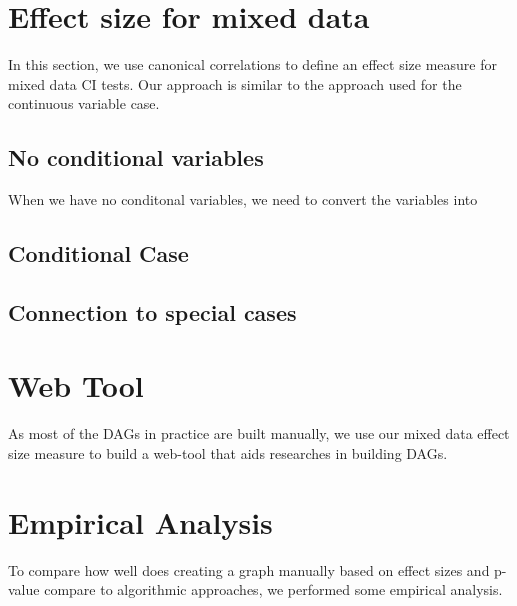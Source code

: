 \documentclass[letterpaper]{article} %
\begin{document}
\section{Effect size for mixed data}
In this section, we use canonical correlations to define an effect size measure
for mixed data CI tests. Our approach is similar to the approach used for the
continuous variable case. 

\subsection{No conditional variables}
When we have no conditonal variables, we need to convert the variables into 

\subsection{Conditional Case}

\subsection{Connection to special cases}

\section{Web Tool}
As most of the DAGs in practice are built manually, we use our mixed data effect size measure to build a web-tool that aids researches in building DAGs.


\section{Empirical Analysis}
To compare how well does creating a graph manually based on effect sizes and
p-value compare to algorithmic approaches, we performed some empirical
analysis.
\end{document}
